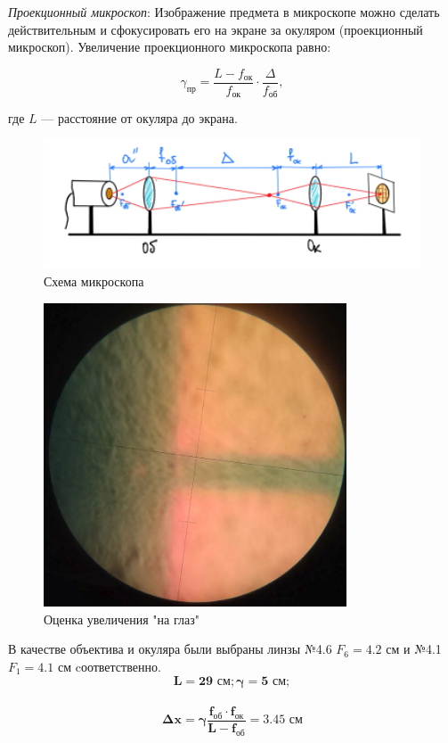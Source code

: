 \textit{Проекционный микроскоп}:
Изображение предмета в микроскопе можно сделать действительным и сфокусировать его на экране за окуляром (проекционный микроскоп). Увеличение проекционного микроскопа равно:

\begin{equation}
\gamma_{\text{пр}} = \frac{L - f_{\text{ок}}}{f_{\text{ок}}} \cdot \frac{\Delta}{f_{\text{об}}},
\end{equation}

где $L$ --- расстояние от окуляра до экрана.
\begin{figure}[h!]
    \centering
    \includegraphics[width=14cm]{images/setup5.png}
    \caption {Схема микроскопа}
\end{figure}


\begin{figure}[h!]
    \centering
    \includegraphics[width=9cm]{images/task5.jpg}
    \caption {Оценка увеличения "на глаз"}
\end{figure}

В качестве объектива и окуляра были выбраны линзы №4.6 $F_6 = 4.2$ см и №4.1 $F_1 = 4.1$ см cоответственно.\\
$$\bm{L = 29\textbf{ см}; \gamma = 5 \textbf{ см}};$$ \\$$\bm{\Delta x = \gamma \frac{f_{\textbf{об}} \cdot f_{\textbf{ок}}}{L - f_{\textbf{об}}} = 3.45 \textbf{ см}}$$


